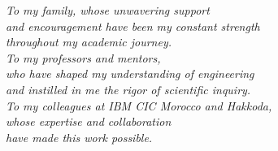 \thispagestyle{empty}
\vspace*{4cm}
\begin{flushright}
  \itshape
  To my family, whose unwavering support\\
  and encouragement have been my constant strength\\
  throughout my academic journey.\\[1cm]
  To my professors and mentors,\\
  who have shaped my understanding of engineering\\
  and instilled in me the rigor of scientific inquiry.\\[1cm]
  To my colleagues at IBM CIC Morocco and Hakkoda,\\
  whose expertise and collaboration\\
  have made this work possible.
\end{flushright}
\newpage
